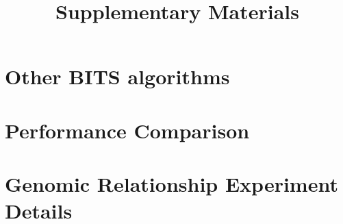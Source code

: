 \documentclass[12pt]{article}
\title{Supplementary Materials}
\begin{document}
  \maketitle

\section{Other BITS algorithms}



\section{Performance Comparison}






\section{Genomic Relationship Experiment Details}

\end{document}
